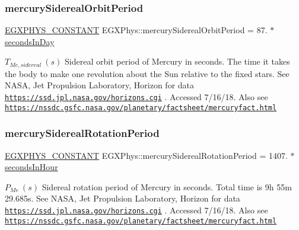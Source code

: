 \subsubsection{\texorpdfstring{mercury\+Sidereal\+Orbit\+Period}{mercurySiderealOrbitPeriod}}
{\footnotesize\ttfamily \mbox{\hyperlink{group___e_g_x_phys-_constants-_macros_ga76980d288494ce1714c9ac68a95ba702}{E\+G\+X\+P\+H\+Y\+S\+\_\+\+C\+O\+N\+S\+T\+A\+NT}} E\+G\+X\+Phys\+::mercury\+Sidereal\+Orbit\+Period = 87. $\ast$ \mbox{\hyperlink{namespace_e_g_x_phys_a93d2a00d75411b58cbf63ab3fd1f8bc2}{seconds\+In\+Day}}}

$ T_{Me,sidereal} \ (s)$ Sidereal orbit period of Mercury in seconds. The time it takes the body to make one revolution about the Sun relative to the fixed stars. See N\+A\+SA, Jet Propulsion Laboratory, Horizon for data \href{https://ssd.jpl.nasa.gov/horizons.cgi}{\tt https\+://ssd.\+jpl.\+nasa.\+gov/horizons.\+cgi} . Accessed 7/16/18. Also see \href{https://nssdc.gsfc.nasa.gov/planetary/factsheet/mercuryfact.html}{\tt https\+://nssdc.\+gsfc.\+nasa.\+gov/planetary/factsheet/mercuryfact.\+html} \mbox{\label{group___e_g_x_phys-_constants-_astrophysics-_solar_system-_mercury-_orbit_ga5908bc1ce452d68e135a79df00e7b242}} 
\subsubsection{\texorpdfstring{mercury\+Sidereal\+Rotation\+Period}{mercurySiderealRotationPeriod}}
{\footnotesize\ttfamily \mbox{\hyperlink{group___e_g_x_phys-_constants-_macros_ga76980d288494ce1714c9ac68a95ba702}{E\+G\+X\+P\+H\+Y\+S\+\_\+\+C\+O\+N\+S\+T\+A\+NT}} E\+G\+X\+Phys\+::mercury\+Sidereal\+Rotation\+Period = 1407. $\ast$ \mbox{\hyperlink{namespace_e_g_x_phys_a7c3165cd93e36f1fb8e9fef80f117bef}{seconds\+In\+Hour}}}

$ P_{Me} \ (s)$ Sidereal rotation period of Mercury in seconds. Total time is 9h 55m 29.\+685s. See N\+A\+SA, Jet Propulsion Laboratory, Horizon for data \href{https://ssd.jpl.nasa.gov/horizons.cgi}{\tt https\+://ssd.\+jpl.\+nasa.\+gov/horizons.\+cgi} . Accessed 7/16/18. Also see \href{https://nssdc.gsfc.nasa.gov/planetary/factsheet/mercuryfact.html}{\tt https\+://nssdc.\+gsfc.\+nasa.\+gov/planetary/factsheet/mercuryfact.\+html} \mbox{\label{group___e_g_x_phys-_constants-_astrophysics-_solar_system-_mercury-_orbit_gaf0cbddbe7b55b40ccf50b3ba7747ba52}} 
